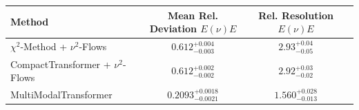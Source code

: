     \begin{tabular}{lccc}
        \toprule
        Method & Mean Rel. Deviation $E(\nu)E$ & Rel. Resolution $E(\nu)E$ \\
        \midrule
        $\chi^2$-Method + $\nu^2$-Flows & $0.612^{+0.004}_{-0.003}$ & $2.93^{+0.04}_{-0.05}$ \\
        CompactTransformer + $\nu^2$-Flows & $0.612^{+0.002}_{-0.002}$ & $2.92^{+0.03}_{-0.02}$ \\
        MultiModalTransformer & $0.2093^{+0.0018}_{-0.0021}$ & $1.560^{+0.028}_{-0.013}$ \\
        \bottomrule
    \end{tabular}